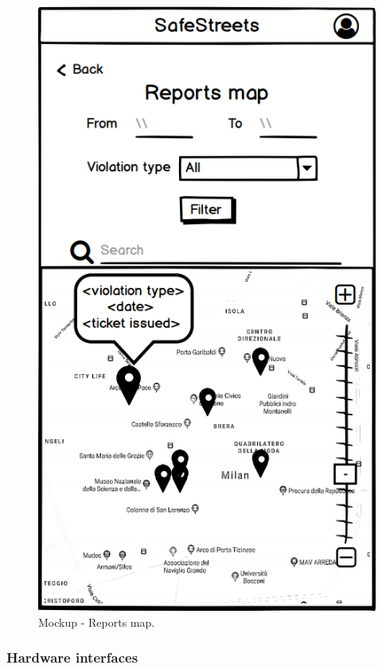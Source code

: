 \begin{@empty}
\begin{figure}[H]
\centering
\begin{minipage}{.4\textwidth}
    \centering
    \includegraphics[width=.8\textwidth]{Images/reports-map.png}
    \caption{\label{fig:mockup-reports-map}Mockup - Reports map.}
\end{minipage}
\end{figure}
\end{@empty}

\subsubsection{Hardware interfaces}
